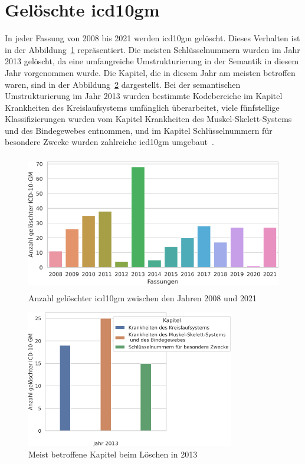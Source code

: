 \section{Gelöschte \acs{icd10gm}} \label{sec:deletedicd}

In jeder Fassung von 2008 bis 2021 werden \ac{icd10gm} gelöscht. Dieses Verhalten ist in der Abbildung~\ref{fig:newdeleteoldicdyear} repräsentiert. Die meisten Schlüsselnummern wurden im Jahr 2013 gelöscht, da eine umfangreiche Umstrukturierung in der Semantik in diesem Jahr vorgenommen wurde. Die Kapitel, die in diesem Jahr am meisten betroffen waren, sind in der Abbildung~\ref{fig:kap13} dargestellt. Bei der semantischen Umstrukturierung im Jahr 2013 wurden bestimmte Kodebereiche im Kapitel \textsf{Krankheiten des Kreislaufsystems} umfänglich überarbeitet, viele fünfstellige Klassifizierungen wurden vom Kapitel \textsf{Krankheiten des Muskel-Skelett-Systems und des Bindegewebes} entnommen, und im Kapitel \textsf{Schlüsselnummern für besondere Zwecke} wurden zahlreiche \ac{icd10gm} umgebaut~\cite{dele13}.

\begin{figure}[ht]
	\centering
	\includegraphics[height=6cm]{figures/neuVersionDelete}
	\caption[Gelöschte \acs{icd10gm} pro Jahr]{Anzahl gelöschter \acs{icd10gm} zwischen den Jahren 2008 und 2021}
	\label{fig:newdeleteoldicdyear}
\end{figure} 

\clearpage

\begin{figure}[ht]
	\centering
	\includegraphics[height=6cm]{figures/kaptnr13}
	\caption{Meist betroffene Kapitel beim Löschen in 2013}
	\label{fig:kap13}
\end{figure}


